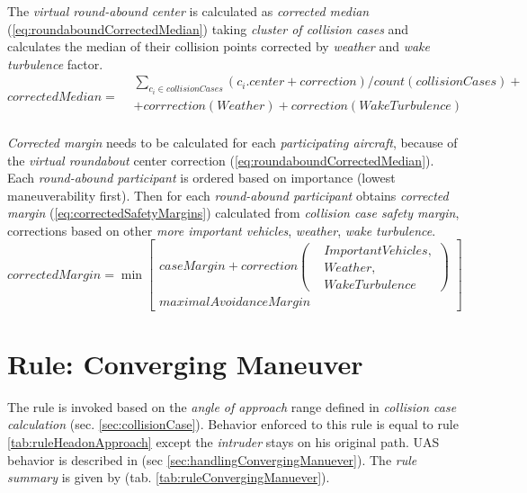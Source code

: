 \noindent The \emph{virtual round-abound center} is calculated as \emph{corrected median} (\ref{eq:roundaboundCorrectedMedian}) taking \emph{cluster of collision cases} and calculates the median of their collision points corrected by \emph{weather} and \emph{wake turbulence} factor.
\begin{equation}\label{eq:roundaboundCorrectedMedian}
    correctedMedian=
    \begin{aligned}
    &\sum_{c_i\in collisionCases}\left(c_i.center+correction\right)/count(collisionCases) + \\
    &+ corrrection(Weather) + correction(WakeTurbulence)\\
    \end{aligned}
\end{equation}

\noindent \emph{Corrected margin} needs to be calculated for each \emph{participating aircraft}, because of the \emph{virtual roundabout} center correction (\ref{eq:roundaboundCorrectedMedian}).
Each \emph{round-abound participant} is ordered based on importance (lowest maneuverability first). Then for each  \emph{round-abound participant} obtains \emph{corrected margin} (\ref{eq:correctedSafetyMargins}) calculated from \emph{collision case safety margin}, corrections based on other \emph{more important vehicles}, \emph{weather}, \emph{wake turbulence}.
\begin{equation}\label{eq:correctedSafetyMargins}
    correctedMargin =\min \begin{bmatrix} 
        caseMargin + correction\left(\begin{aligned}&ImportantVehicles,\\&Weather,\\&WakeTurbulence\end{aligned}\right)\\
        maximalAvoidanceMargin
    \end{bmatrix}
\end{equation}


\newpage
\section{Rule: Converging Maneuver}\label{sec:ruleConvergingManuever}
\noindent The rule is invoked based on the \emph{angle of approach} range defined in \emph{collision case calculation} (sec. \ref{sec:collisionCase}). Behavior enforced to this rule is equal to rule \ref{tab:ruleHeadonApproach} except the \emph{intruder} stays on his original path. UAS behavior is described in (sec \ref{sec:handlingConvergingManuever}). The \emph{rule summary} is given by (tab. \ref{tab:ruleConvergingManuever}).

